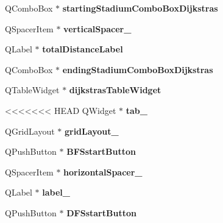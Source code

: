 \begin{DoxyCompactItemize}
Q\+Combo\+Box $\ast$ {\bfseries starting\+Stadium\+Combo\+Box\+Dijkstras}
\item 
\mbox{\label{class_ui___main_window_ac845bdf6b5b5237378a7b067808b7a31}} 
Q\+Spacer\+Item $\ast$ {\bfseries vertical\+Spacer\+\_}
\item 
\mbox{\label{class_ui___main_window_a3e42cf31133f6fb31d515d9b796b97c7}} 
Q\+Label $\ast$ {\bfseries total\+Distance\+Label}
\item 
\mbox{\label{class_ui___main_window_a1d094ac9c7dd9721830954c8f772aa88}} 
Q\+Combo\+Box $\ast$ {\bfseries ending\+Stadium\+Combo\+Box\+Dijkstras}
\item 
\mbox{\label{class_ui___main_window_a903d613fd69c321aa4d62393b1d6b2a5}} 
Q\+Table\+Widget $\ast$ {\bfseries dijkstras\+Table\+Widget}
\item 
<<<<<<< HEAD
\mbox{\label{class_ui___main_window_a83495b23cbc6810f81978dc0d584b810}} 
Q\+Widget $\ast$ {\bfseries tab\+\_}
\item 
\mbox{\label{class_ui___main_window_ad113cf7b76aaf178473555bdf64ff035}} 
Q\+Grid\+Layout $\ast$ {\bfseries grid\+Layout\+\_}
\item 
\mbox{\label{class_ui___main_window_af5155151e977b03494f1110b104082a3}} 
Q\+Push\+Button $\ast$ {\bfseries B\+F\+Sstart\+Button}
\item 
\mbox{\label{class_ui___main_window_a4fc05b11984637298795a354792c4023}} 
Q\+Spacer\+Item $\ast$ {\bfseries horizontal\+Spacer\+\_}
\item 
\mbox{\label{class_ui___main_window_a78c7e10730b43c6700cd7216911ed76a}} 
Q\+Label $\ast$ {\bfseries label\+\_}
\item 
\mbox{\label{class_ui___main_window_a7d149fab4ef6b1172c18d0cc73773113}} 
Q\+Push\+Button $\ast$ {\bfseries D\+F\+Sstart\+Button}
\item 
\mbox{\label{class_ui___main_window_ad6bab8fb8903b8f41afea1218ee52695}} 

\end{DoxyCompactItemize}
